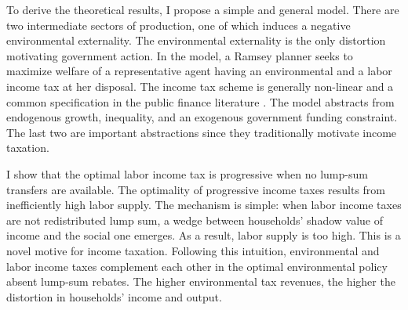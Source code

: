 To derive the theoretical results, I propose a simple and general model. There are two intermediate sectors of production, one of which induces a negative environmental externality. The environmental externality is the only distortion motivating government action. In the model, a Ramsey planner seeks to maximize welfare of a representative agent having  an environmental and a labor income tax at her disposal. The income tax scheme is generally non-linear and a common specification in the public finance literature \citep[e.g.][]{Benabou2002TaxEfficiency, Heathcote2017OptimalFramework}.
The model abstracts from  endogenous growth, inequality, and an exogenous government funding constraint. The last two are important abstractions since they traditionally motivate income taxation.

I show that the optimal labor income tax is progressive when no lump-sum transfers are available. 
The optimality of progressive income taxes results from inefficiently high labor supply. The mechanism is simple: when labor income taxes are not redistributed lump sum, a wedge between households' shadow value of income and the social one emerges.  As a result, labor supply is too high. 
This is a novel motive for income taxation.
Following this intuition, environmental and labor income taxes complement each other in the optimal environmental policy absent lump-sum rebates. The higher environmental tax revenues, the higher the distortion in households' income and output. 
  
